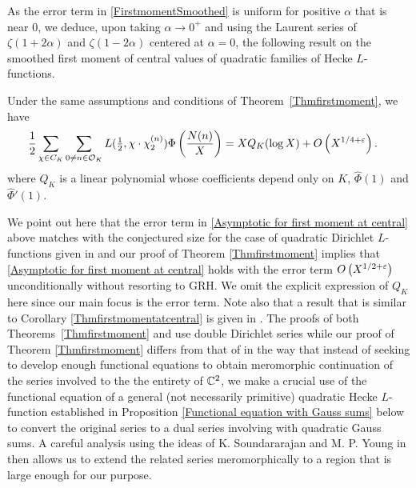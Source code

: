 \documentclass[twoside,leqno,10pt, A4]{amsart}
\begin{document}
   As the error term in \eqref{FirstmomentSmoothed} is uniform for positive $\alpha$ that is near $0$, we deduce, upon taking $\alpha \rightarrow 0^+$ and using the Laurent series of $\zeta(1+2\alpha)$ and $\zeta(1-2\alpha)$ centered at $\alpha=0$, the following result on the smoothed first moment of central values of quadratic families of Hecke $L$-functions.

\begin{corollary} \label{Thmfirstmomentatcentral}
Under the same assumptions and conditions of Theorem~\ref{Thmfirstmoment}, we have
\begin{align} \label{Asymptotic for first moment at central}
\begin{split}			
	& 	\frac {1}{2}\sum_{\chi \in C_K} \sum_{0 \neq n \in \mathcal O_K} L(\tfrac{1}{2}, \chi \cdot \chi^{(n)}_{2})\Phi \left( \frac {N(n)}X
\right)   = XQ_K(\log X)+O\left( X^{1/4+\varepsilon}\right).
\end{split}
\end{align}
  where $Q_K$ is a linear polynomial whose coefficients depend only on $K$, $\widehat \Phi(1)$ and $\widehat \Phi'(1)$.
\end{corollary}

  We point out here that the error term in \eqref{Asymptotic for first moment at central} above matches with the conjectured size for the case
of quadratic Dirichlet $L$-functions given in \cite{DoHo} and our proof of Theorem \ref{Thmfirstmoment} implies that
\eqref{Asymptotic for first moment at central} holds with the error term $O\left(  X^{1/2+\varepsilon}\right)$ unconditionally without resorting to GRH. We omit the explicit
expression of $Q_K$ here since our main focus is the error term. Note also that a result that is similar to Corollary
\ref{Thmfirstmomentatcentral} is given in \cite[Theorem 1.1]{G&Zhao2023-5}.  The proofs of both Theorems~\ref{Thmfirstmoment} and
\cite[Theorem 1.1]{G&Zhao2023-5} use double Dirichlet series while our proof of Theorem \ref{Thmfirstmoment} differs from that of
\cite[Theorem 1.1]{G&Zhao2023-5} in the way that instead of seeking to develop enough functional equations to obtain meromorphic continuation
of the series involved to the the entirety of $\mathbb C^2$, we make a crucial use of the functional equation of a general (not necessarily primitive)
quadratic Hecke $L$-function established in Proposition \ref{Functional equation with Gauss sums} below to convert the original series to a
dual series involving with quadratic Gauss sums. A careful analysis using the ideas of K. Soundararajan and M. P. Young in \cite{S&Y} then
allows us to extend the related series meromorphically to a region that is large enough for our purpose. \newline
\end{document}
